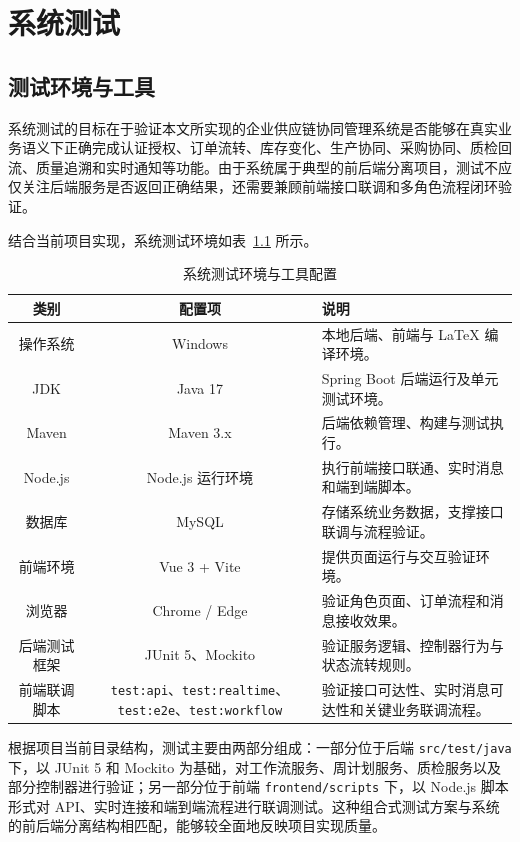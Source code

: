\chapter{系统测试}

\section{测试环境与工具}

系统测试的目标在于验证本文所实现的企业供应链协同管理系统是否能够在真实业务语义下正确完成认证授权、订单流转、库存变化、生产协同、采购协同、质检回流、质量追溯和实时通知等功能。由于系统属于典型的前后端分离项目，测试不应仅关注后端服务是否返回正确结果，还需要兼顾前端接口联调和多角色流程闭环验证。

结合当前项目实现，系统测试环境如表~\ref{tab:test-env-real} 所示。

\begin{table}[htbp]
\centering
\footnotesize
\caption{系统测试环境与工具配置}
\label{tab:test-env-real}
\begin{tabular}{|c|c|p{6.2cm}|}
\hline
类别 & 配置项 & 说明 \\\hline
操作系统 & Windows & 本地后端、前端与 LaTeX 编译环境。 \\\hline
JDK & Java 17 & Spring Boot 后端运行及单元测试环境。 \\\hline
Maven & Maven 3.x & 后端依赖管理、构建与测试执行。 \\\hline
Node.js & Node.js 运行环境 & 执行前端接口联通、实时消息和端到端脚本。 \\\hline
数据库 & MySQL & 存储系统业务数据，支撑接口联调与流程验证。 \\\hline
前端环境 & Vue 3 + Vite & 提供页面运行与交互验证环境。 \\\hline
浏览器 & Chrome / Edge & 验证角色页面、订单流程和消息接收效果。 \\\hline
后端测试框架 & JUnit 5、Mockito & 验证服务逻辑、控制器行为与状态流转规则。 \\\hline
前端联调脚本 & \texttt{test:api}、\texttt{test:realtime}、\texttt{test:e2e}、\texttt{test:workflow} & 验证接口可达性、实时消息可达性和关键业务联调流程。 \\\hline
\end{tabular}
\end{table}

根据项目当前目录结构，测试主要由两部分组成：一部分位于后端 \texttt{src/test/java} 下，以 JUnit 5 和 Mockito 为基础，对工作流服务、周计划服务、质检服务以及部分控制器进行验证；另一部分位于前端 \texttt{frontend/scripts} 下，以 Node.js 脚本形式对 API、实时连接和端到端流程进行联调测试。这种组合式测试方案与系统的前后端分离结构相匹配，能够较全面地反映项目实现质量。

